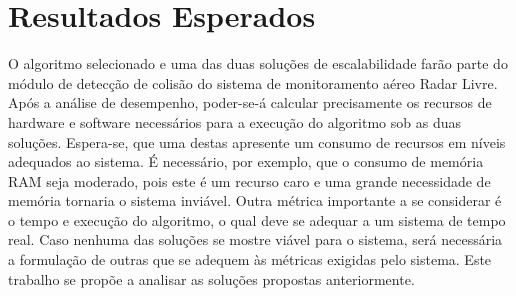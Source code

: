 \section{Resultados Esperados}

O algoritmo selecionado e uma das duas soluções de escalabilidade farão parte do módulo de detecção de colisão do sistema de monitoramento aéreo Radar Livre. Após a análise de desempenho, poder-se-á calcular precisamente os recursos de hardware e software necessários para a execução do algoritmo sob as duas soluções. Espera-se, que uma destas apresente um consumo de recursos em níveis adequados ao sistema. É necessário, por exemplo, que o consumo de memória RAM seja moderado, pois este é um recurso caro e uma grande necessidade de memória tornaria o sistema inviável. Outra métrica importante a se considerar é o tempo e execução do algoritmo, o qual deve se adequar a um sistema de tempo real. Caso nenhuma das soluções se mostre viável para o sistema, será necessária a formulação de outras que se adequem às métricas exigidas pelo sistema. Este trabalho se propõe a analisar as soluções propostas anteriormente.